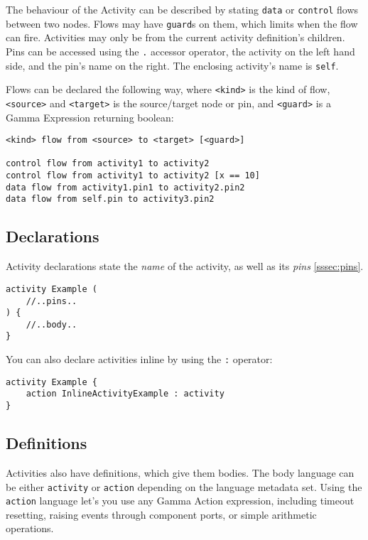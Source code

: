 The behaviour of the Activity can be described by stating \verb|data| or \verb|control| flows between two nodes. Flows may have \verb|guard|s on them, which limits when the flow can fire. Activities may only be from the current activity definition's children. Pins can be accessed using the \verb|.| accessor operator, the activity on the left hand side, and the pin's name on the right. The enclosing activity's name is \verb|self|.

Flows can be declared the following way, where \verb|<kind>| is the kind of flow, \verb|<source>| and \verb|<target>| is the source/target node or pin, and \verb|<guard>| is a Gamma Expression returning boolean:

\begin{lstlisting}[language=activity]
<kind> flow from <source> to <target> [<guard>]

control flow from activity1 to activity2
control flow from activity1 to activity2 [x == 10]
data flow from activity1.pin1 to activity2.pin2
data flow from self.pin to activity3.pin2
\end{lstlisting}

\subsection*{Declarations}

Activity declarations state the \emph{name} of the activity, as well as its \emph{pins} \ref{sssec:pins}. 

\begin{lstlisting}[language=activity]
activity Example (
	//..pins..
) {
	//..body..
}
\end{lstlisting}

You can also declare activities inline by using the \verb|:| operator:

\begin{lstlisting}[language=activity]
activity Example {
	action InlineActivityExample : activity
}
\end{lstlisting}

\subsection*{Definitions}

Activities also have definitions, which give them bodies. The body language can be either \verb|activity| or \verb|action| depending on the language metadata set. Using the \verb|action| language let's you use any Gamma Action expression, including timeout resetting, raising events through component ports, or simple arithmetic operations.

